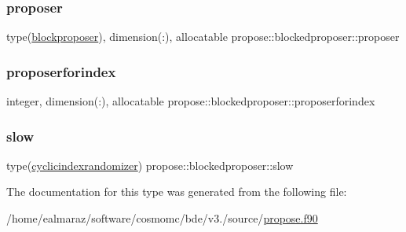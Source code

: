 \mbox{\label{structpropose_1_1blockedproposer_a32572d608cf67d16362c9040bd695f9e}} 
\subsubsection{\texorpdfstring{proposer}{proposer}}
{\footnotesize\ttfamily type(\mbox{\hyperlink{structpropose_1_1blockproposer}{blockproposer}}), dimension(\+:), allocatable propose\+::blockedproposer\+::proposer}

\mbox{\label{structpropose_1_1blockedproposer_a5e08647dcd98493eea7eef238658dfbe}} 
\subsubsection{\texorpdfstring{proposerforindex}{proposerforindex}}
{\footnotesize\ttfamily integer, dimension(\+:), allocatable propose\+::blockedproposer\+::proposerforindex}

\mbox{\label{structpropose_1_1blockedproposer_acf2dbf89ad874f8a5c55fc026c12a502}} 
\subsubsection{\texorpdfstring{slow}{slow}}
{\footnotesize\ttfamily type(\mbox{\hyperlink{structpropose_1_1cyclicindexrandomizer}{cyclicindexrandomizer}}) propose\+::blockedproposer\+::slow}



The documentation for this type was generated from the following file\+:\begin{DoxyCompactItemize}
\item 
/home/ealmaraz/software/cosmomc/bde/v3./source/\mbox{\hyperlink{propose_8f90}{propose.\+f90}}\end{DoxyCompactItemize}
